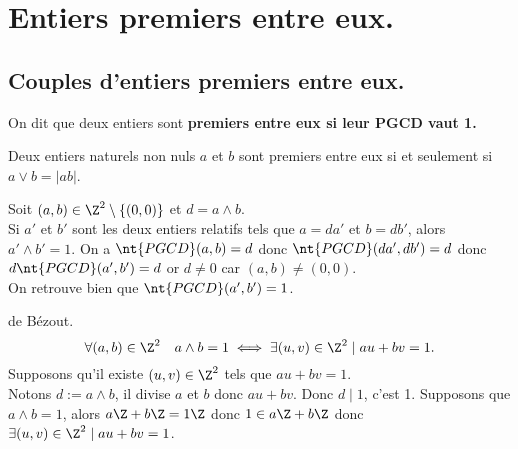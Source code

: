 \documentclass[11pt]{article}
\newcommand*{\PGCD}{\nt{PGCD}}
\begin{document}
\section{Entiers premiers entre eux.}
\subsection{Couples d'entiers premiers entre eux.}

\begin{defi}{}{}
    On dit que deux entiers sont \bf{premiers entre eux} si leur PGCD vaut 1.
\end{defi}

\begin{prop}{}{}
    Deux entiers naturels non nuls $a$ et $b$ sont premiers entre eux si et seulement si $a\lor b=|ab|$.
\end{prop}

\begin{prop}{}{}
    Soit $(a,b)\in\Z^2\setminus\{(0,0)\}$ et $d=a\land b$.\\
    Si $a'$ et $b'$ sont les deux entiers relatifs tels que $a=da'$ et $b=db'$, alors $a'\land b'=1$.
    \tcblower
    On a $\PGCD(a,b)=d$ donc $\PGCD(da',db')=d$ donc $d\PGCD(a',b')=d$ or $d\neq0$ car $(a,b)\neq(0,0)$.\\
    On retrouve bien que $\PGCD(a',b')=1$.
\end{prop}

\begin{thm}{de Bézout.}{}
    \begin{equation*}
        \forall(a,b)\in\Z^2\quad a\land b = 1 \iff \exists(u,v)\in\Z^2\mid au+bv=1.
    \end{equation*}
    \tcblower
    \fbox{$\la$} Supposons qu'il existe $(u,v)\in\Z^2$ tels que $au+bv=1$.\\
    Notons $d:=a\land b$, il divise $a$ et $b$ donc $au+bv$. Donc $d\mid 1$, c'est 1.\n
    \fbox{$\ra$} Supposons que $a\land b = 1$, alors $a\Z+b\Z=1\Z$ donc $1\in a\Z+b\Z$ donc $\exists (u,v)\in\Z^2\mid au+bv=1$.
\end{thm}
\end{document}
